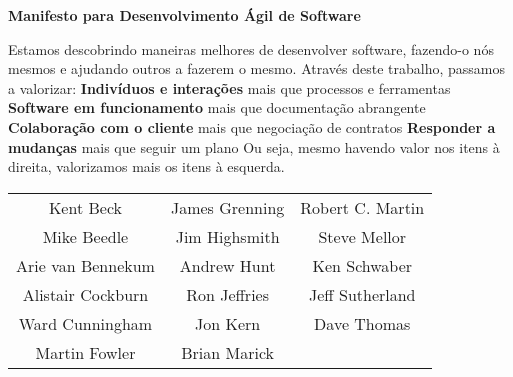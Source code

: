       \begin{center}
        \textbf{Manifesto para Desenvolvimento Ágil de Software}

        Estamos descobrindo maneiras melhores de desenvolver software, fazendo-o
        nós mesmos e ajudando outros a fazerem o mesmo. Através deste trabalho,
        passamos a valorizar: \newline
        \textbf{Indivíduos e interações} mais que processos e ferramentas \newline
        \textbf{Software em funcionamento} mais que documentação abrangente \newline
        \textbf{Colaboração com o cliente} mais que negociação de contratos \newline
        \textbf{Responder a mudanças} mais que seguir um plano \newline
        Ou seja, mesmo havendo valor nos itens à direita, valorizamos mais os
        itens à esquerda.

        \begin{tabular}{c c c}
          Kent Beck & James Grenning & Robert C. Martin \\
          Mike Beedle & Jim Highsmith & Steve Mellor \\
          Arie van Bennekum & Andrew Hunt & Ken Schwaber \\
          Alistair Cockburn & Ron Jeffries & Jeff Sutherland \\
          Ward Cunningham & Jon Kern & Dave Thomas \\
          Martin Fowler & Brian Marick \\
        \end{tabular}

        \cite{manifestoAgile}

      \end{center}

